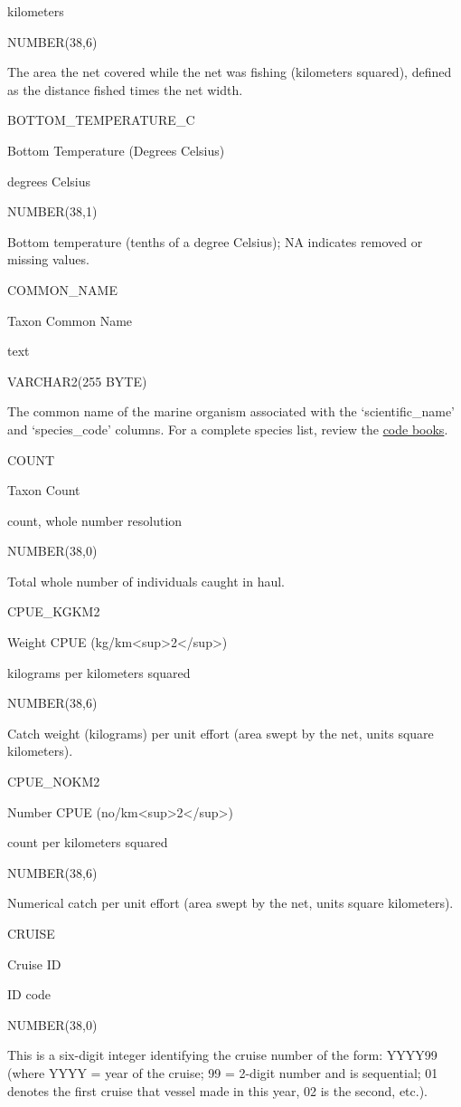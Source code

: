\documentclass[
  letterpaper,
  oneside,
  open=any]{scrbook}
\begin{document}
kilometers

NUMBER(38,6)

The area the net covered while the net was fishing (kilometers squared),
defined as the distance fished times the net width.

BOTTOM\_TEMPERATURE\_C

Bottom Temperature (Degrees Celsius)

degrees Celsius

NUMBER(38,1)

Bottom temperature (tenths of a degree Celsius); NA indicates removed or
missing values.

COMMON\_NAME

Taxon Common Name

text

VARCHAR2(255 BYTE)

The common name of the marine organism associated with the
`scientific\_name' and `species\_code' columns. For a complete species
list, review the
\href{https://www.fisheries.noaa.gov/resource/document/groundfish-survey-species-code-manual-and-data-codes-manual}{code
books}.

COUNT

Taxon Count

count, whole number resolution

NUMBER(38,0)

Total whole number of individuals caught in haul.

CPUE\_KGKM2

Weight CPUE (kg/km\textless sup\textgreater2\textless/sup\textgreater)

kilograms per kilometers squared

NUMBER(38,6)

Catch weight (kilograms) per unit effort (area swept by the net, units
square kilometers).

CPUE\_NOKM2

Number CPUE (no/km\textless sup\textgreater2\textless/sup\textgreater)

count per kilometers squared

NUMBER(38,6)

Numerical catch per unit effort (area swept by the net, units square
kilometers).

CRUISE

Cruise ID

ID code

NUMBER(38,0)

This is a six-digit integer identifying the cruise number of the form:
YYYY99 (where YYYY = year of the cruise; 99 = 2-digit number and is
sequential; 01 denotes the first cruise that vessel made in this year,
02 is the second, etc.).
\end{document}
